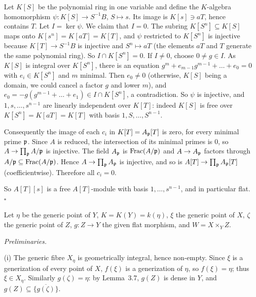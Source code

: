 \documentclass[11pt]{article}
\begin{document}
Let $K[S]$ be the polynomial ring in one variable and define the $K$-algebra homomorphism $\psi:K[S]\to S^{-1}B$, $S\mapsto s$. Its image is $K[s]\ni aT$, hence contains $T$. Let $I=\ker\psi$. We claim that $I=0$. The subring $K[S^n]\subseteq K[S]$ maps onto $K[s^n]=K[aT]=K[T]$, and $\psi$ restricted to $K[S^n]$ is injective because $K[T]\to S^{-1}B$ is injective and $S^n\mapsto aT$ (the elements $aT$ and $T$ generate the same polynomial ring). So $I\cap K[S^n]=0$. If $I\ne0$, choose $0\ne g\in I$. As $K[S]$ is integral over $K[S^n]$, there is an equation $g^m+e_{m-1}g^{m-1}+\dots+e_0=0$ with $e_i\in K[S^n]$ and $m$ minimal. Then $e_0\neq0$ (otherwise, $K[S]$ being a domain, we could cancel a factor $g$ and lower $m$), and $e_0=-g(g^{m-1}+\dots+e_1)\in I\cap K[S^n]$, a contradiction. So $\psi$ is injective, and $1,s,\dots,s^{n-1}$ are linearly independent over $K[T]$: indeed $K[S]$ is free over $K[S^n]=K[aT]=K[T]$ with basis $1,S,\dots,S^{n-1}$.

Consequently the image of each $c_i$ in $K[T]=A_{\mathfrak p}[T]$ is zero, for every minimal prime $\mathfrak p$. Since $A$ is reduced, the intersection of its minimal primes is $0$, so $A\to\prod_{\mathfrak p}A/\mathfrak p$ is injective. The field $A_{\mathfrak p}$ is $\operatorname{Frac}(A/\mathfrak p)$ and $A\to A_\mathfrak p$ factors through $A/\mathfrak p\subseteq\operatorname{Frac}(A/\mathfrak p)$. Hence $A\to\prod_{\mathfrak p}A_{\mathfrak p}$ is injective, and so is $A[T]\to\prod_{\mathfrak p}A_{\mathfrak p}[T]$ (coefficientwise). Therefore all $c_i=0$.

So $A[T][s]$ is a free $A[T]$-module with basis $1,\dots,s^{n-1}$, and in particular flat. \hfill$\square$

\pf
Let $\eta$ be the generic point of $Y$, $K=K(Y)=k(\eta)$, $\xi$ the generic point of $X$, $\zeta$ the generic point of $Z$, $g:Z\to Y$ the given flat morphism, and $W=X\times_YZ$.

\emph{Preliminaries.}

(i) The generic fibre $X_\eta$ is geometrically integral, hence non-empty. Since $\xi$ is a generization of every point of $X$, $f(\xi)$ is a generization of $\eta$, so $f(\xi)=\eta$; thus $\xi\in X_\eta$. Similarly $g(\zeta)=\eta$: by Lemma~3.7, $g(Z)$ is dense in $Y$, and $g(Z)\subseteq\overline{\{g(\zeta)\}}$.
\end{document}

